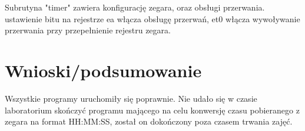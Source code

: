 \documentclass[12pt,a4paper]{article}
\begin{document}
		\begin{minipage}{.5\textwidth}
			
		\end{minipage}%
		\begin{minipage}{.5\textwidth}
			Subrutyna "timer" zawiera konfigurację zegara, oraz obsługi przerwania. ustawienie bitu na rejestrze ea włącza obsługę
			przerwań, et0 włącza wywoływanie przerwania przy przepełnienie rejestru zegara.
		\end{minipage}

	\section{Wnioski/podsumowanie}
	
			Wszystkie programy uruchomiły się poprawnie. Nie udało się w czasie laboratorium skończyć programu mającego na celu konwersję czasu pobieranego z zegara na format HH:MM:SS, został on dokończony poza czasem trwania zajęć.
	
\end{document}
